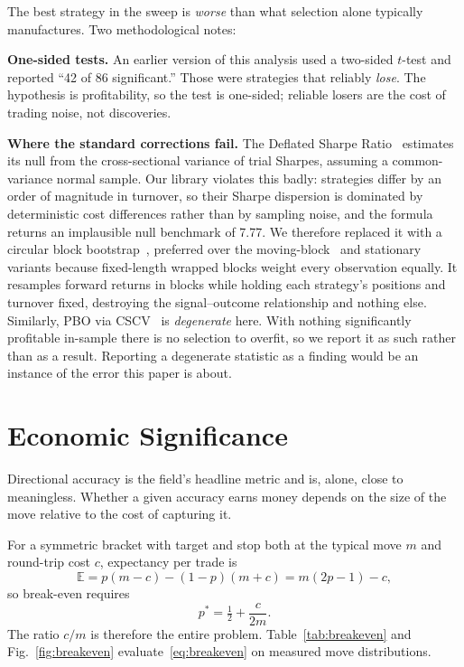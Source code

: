 \documentclass[conference]{IEEEtran}
\begin{document}
The best strategy in the sweep is \emph{worse} than what selection alone
typically manufactures. Two methodological notes:

\textbf{One-sided tests.} An earlier version of this analysis used a two-sided
$t$-test and reported ``42 of 86 significant.'' Those were strategies that
reliably \emph{lose}. The hypothesis is profitability, so the test is one-sided;
reliable losers are the cost of trading noise, not discoveries.

\textbf{Where the standard corrections fail.} The Deflated Sharpe
Ratio~\cite{bailey2014} estimates its null from the cross-sectional variance of
trial Sharpes, assuming a common-variance normal sample. Our library violates
this badly: strategies differ by an order of magnitude in turnover, so their
Sharpe dispersion is dominated by deterministic cost differences rather than by
sampling noise, and the formula returns an implausible null benchmark of 7.77.
We therefore replaced it with a circular block
bootstrap~\cite{politis1992}, preferred over the moving-block~\cite{kunsch1989}
and stationary~\cite{politis1994} variants because fixed-length wrapped blocks
weight every observation equally. It resamples forward returns in blocks
while holding each strategy's positions and turnover fixed, destroying the
signal--outcome relationship and nothing else. Similarly, PBO via
CSCV~\cite{bailey2017} is \emph{degenerate} here. With nothing significantly
profitable in-sample there is no selection to overfit, so we report it as such
rather than as a result. Reporting a degenerate statistic as a finding would be
an instance of the error this paper is about.

\section{Economic Significance}
\label{sec:economic}

Directional accuracy is the field's headline metric and is, alone, close to
meaningless. Whether a given accuracy earns money depends on the size of the
move relative to the cost of capturing it.

For a symmetric bracket with target and stop both at the typical move $m$ and
round-trip cost $c$, expectancy per trade is
\[
\mathbb{E} = p(m - c) - (1-p)(m + c) = m(2p - 1) - c ,
\]
so break-even requires
\begin{equation}
p^{\ast} = \tfrac{1}{2} + \frac{c}{2m}.
\label{eq:breakeven}
\end{equation}
The ratio $c/m$ is therefore the entire problem. Table~\ref{tab:breakeven} and
Fig.~\ref{fig:breakeven} evaluate~\eqref{eq:breakeven} on measured move
distributions.
\end{document}
